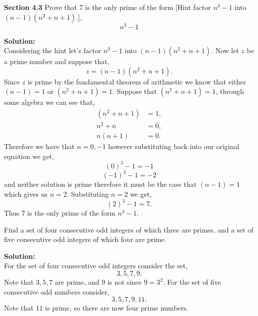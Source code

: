 \documentclass[12pt]{article}
\makeatletter
\theoremstyle{homework}
\newenvironment{exercise}[1]
{\def\@currentlabel{#1}\exercisecore}
{\endexercisecore}
\newcommand{\localhead}[1]{\par\smallskip\noindent\textbf{#1}\nobreak\\}%
\newcommand\solution{\localhead{Solution:}}
\makeatother
\begin{document}
\textbf{Section 4.3}
\begin{exercise}{6} Prove that 7 is the only prime of the form [Hint factor $n^3 - 1$ into $(n-1)(n^2+n+1)$.], 
  \begin{equation*}
    n^3 - 1
  \end{equation*}
  
  \solution Considering the hint let's factor $n^3 - 1$ into $(n-1)(n^2+n+1)$. Now let $z$ be a prime number and
  suppose that, 
  \begin{equation*}
    z = (n-1)(n^2+n+1).
  \end{equation*}
  Since $z$ is prime by the fundamental theorem of arithmetic we know that either $(n-1) = 1$ or $(n^2+n+1) = 1$. 
  Suppose that $(n^2+n+1) = 1$, through some algebra we can see that, 
  \begin{align*}
    (n^2+n+1) &= 1,\\
    n^2+n &=0,\\
  n(n+1)&=0.
  \end{align*}
  Therefore we have that $n = 0,-1$ however substituting back into our original equation we get, 
  \begin{equation*}
    (0)^3 - 1 = -1
  \end{equation*}
  \begin{equation*}
    (-1)^3 - 1 = -2
  \end{equation*}
  and neither solution is prime therefore it must be the case that $(n-1) = 1$ which gives us $n = 2$. Substituting
  $n = 2$ we get,
  \begin{equation*}
    (2)^3 -1 = 7.
  \end{equation*}
  Thus 7 is the only prime of the form $n^3 - 1$. 
\end{exercise}
\vspace{.5in}






\begin{exercise}{7} Find a set of four consecutive odd integers of which three are primes, 
  and a set of five consecutive odd integers of which four are prime.\\
  \solution For the set of four consecutive odd integers consider the set, 
  \begin{equation*}
    3,5,7,9.
  \end{equation*}
  Note that $3,5,7$ are prime, and $9$ is not since $9 = 3^2$. For the set of five consecutive odd numbers 
  consider,
  \begin{equation*}
    3,5,7,9,11.
  \end{equation*} 
  Note that $11$ is prime, so there are now four prime numbers. 
\end{exercise}
\vspace{.5in}
\end{document}
